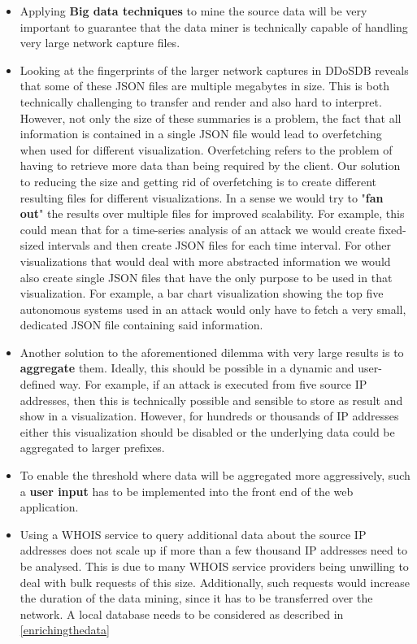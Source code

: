     \begin{itemize}
    \item     Applying \textbf{Big data techniques} to mine the source data will be very important to guarantee that the data miner is technically capable of handling very large network capture files.
\item Looking at the fingerprints of the larger network captures in DDoSDB reveals that some of these JSON files are multiple megabytes in size. This is both technically challenging to transfer and render and also hard to interpret. However, not only the size of these summaries is a problem, the fact that all information is contained in a single JSON file would lead to overfetching when used for different visualization. Overfetching refers to the problem of having to retrieve more data than being required by the client. Our solution to reducing the size and getting rid of overfetching is to create different resulting files for different visualizations. In a sense we would try to "\textbf{fan out}" the results over multiple files for improved scalability. For example, this could mean that for a time-series analysis of an attack we would create fixed-sized intervals and then create JSON files for each time interval. For other visualizations that would deal with more abstracted information we would also create single JSON files that have the only purpose to be used in that visualization. For example, a bar chart visualization showing the top five autonomous systems used in an attack would only have to fetch a very small, dedicated JSON file containing said information.
\item Another solution to the aforementioned dilemma with very large results is to \textbf{aggregate} them. Ideally, this should be possible in a dynamic and user-defined way. For example, if an attack is executed from five source IP addresses, then this is technically possible and sensible to store as result and show in a visualization. However, for hundreds or thousands of IP addresses either this visualization should be disabled or the underlying data could be aggregated to larger prefixes.
\item To enable the threshold where data will be aggregated more aggressively, such a \textbf{user input} has to be implemented into the front end of the web application.
\item Using a WHOIS service to query additional data about the source IP addresses does not scale up if more than a few thousand IP addresses need to be analysed. This is due to many WHOIS service providers being unwilling to deal with bulk requests of this size. Additionally, such requests would increase the duration of the data mining, since it has to be transferred over the network. A local database needs to be considered as described in \ref{enrichingthedata}
\end{itemize}
    
